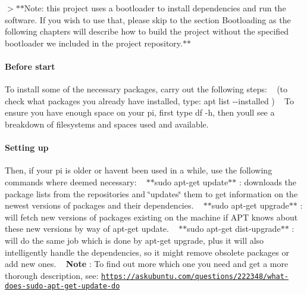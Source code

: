 $>$$\ast$$\ast$\+Note\+: this project uses a bootloader to install dependencies and run the software. If you wish to use that, please skip to the section {\ttfamily Bootloading} as the following chapters will describe how to build the project without the specified bootloader we included in the project repository.$\ast$$\ast$

\paragraph*{Before start}

To install some of the necessary packages, carry out the following steps\+: ~\newline
 (to check what packages you already have installed, type\+: {\ttfamily apt list -\/-\/installed} ) ~\newline
 To ensure you have enough space on your pi, first type {\ttfamily df -\/h}, then you\textquotesingle{}ll see a breakdown of filesystems and spaces used and available. ~\newline
~\newline


\paragraph*{Setting up}

Then, if your pi is older or haven\textquotesingle{}t been used in a while, use the following commands where deemed necessary\+: ~\newline
 $\ast$$\ast${\ttfamily sudo apt-\/get update}$\ast$$\ast$ \+: downloads the package lists from the repositories and \char`\"{}updates\char`\"{} them to get information on the newest versions of packages and their dependencies. ~\newline
 $\ast$$\ast${\ttfamily sudo apt-\/get upgrade}$\ast$$\ast$ \+: will fetch new versions of packages existing on the machine if A\+PT knows about these new versions by way of apt-\/get update. ~\newline
 $\ast$$\ast${\ttfamily sudo apt-\/get dist-\/upgrade}$\ast$$\ast$ \+: will do the same job which is done by apt-\/get upgrade, plus it will also intelligently handle the dependencies, so it might remove obsolete packages or add new ones. ~\newline
 {\bfseries Note} \+: To find out more which one you need and get a more thorough description, see\+: \href{https://askubuntu.com/questions/222348/what-does-sudo-apt-get-update-do}{\tt https\+://askubuntu.\+com/questions/222348/what-\/does-\/sudo-\/apt-\/get-\/update-\/do}

